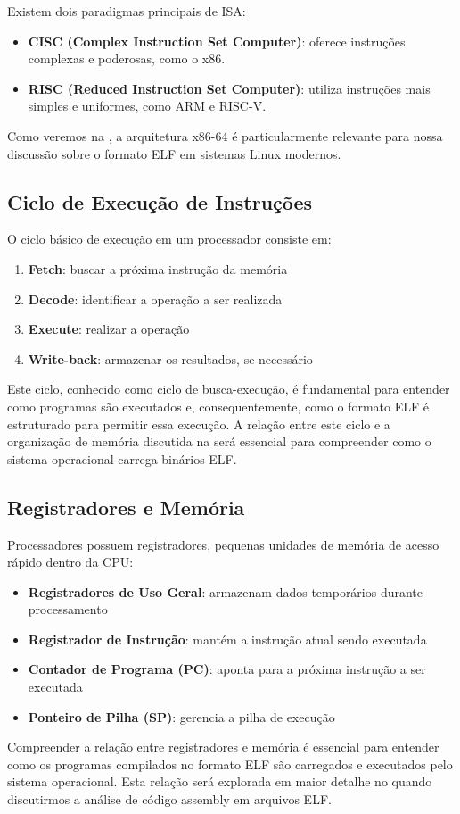 Existem dois paradigmas principais de ISA:
\begin{itemize}
    \item \textbf{CISC (Complex Instruction Set Computer)}: oferece instruções complexas e poderosas, como o x86.
    \item \textbf{RISC (Reduced Instruction Set Computer)}: utiliza instruções mais simples e uniformes, como ARM e RISC-V.
\end{itemize}

Como veremos na , a arquitetura x86-64 é particularmente relevante para nossa discussão sobre o formato ELF em sistemas Linux modernos.

\subsection{Ciclo de Execução de Instruções}\label{subsec:exec_cycle}

O ciclo básico de execução em um processador consiste em:
\begin{enumerate}
    \item \textbf{Fetch}: buscar a próxima instrução da memória
    \item \textbf{Decode}: identificar a operação a ser realizada
    \item \textbf{Execute}: realizar a operação
    \item \textbf{Write-back}: armazenar os resultados, se necessário
\end{enumerate}

Este ciclo, conhecido como ciclo de busca-execução, é fundamental para entender como programas são executados e, consequentemente, como o formato ELF é estruturado para permitir essa execução. A relação entre este ciclo e a organização de memória discutida na  será essencial para compreender como o sistema operacional carrega binários ELF.

\subsection{Registradores e Memória}\label{subsec:registers}

Processadores possuem registradores, pequenas unidades de memória de acesso rápido dentro da CPU:

\begin{itemize}
    \item \textbf{Registradores de Uso Geral}: armazenam dados temporários durante processamento
    \item \textbf{Registrador de Instrução}: mantém a instrução atual sendo executada
    \item \textbf{Contador de Programa (PC)}: aponta para a próxima instrução a ser executada
    \item \textbf{Ponteiro de Pilha (SP)}: gerencia a pilha de execução
\end{itemize}

Compreender a relação entre registradores e memória é essencial para entender como os programas compilados no formato ELF são carregados e executados pelo sistema operacional. Esta relação será explorada em maior detalhe no  quando discutirmos a análise de código assembly em arquivos ELF.